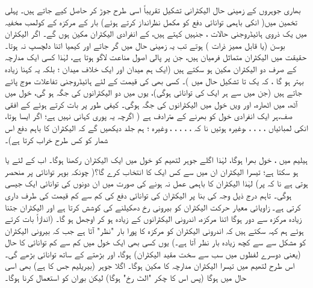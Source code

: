 بھاری جوہروں کے زمینی حال الیکٹرانی تشکیل تقریباً  اسی طرح جوڑ کر حاصل کیے جاتے ہیں۔ پہلی تخمین  میں( انکی باہمی توانائی دفع کو مکمل نظرانداز کرتے ہوئے)  بار  کے مرکزہ کے کولمب مخفیہ میں یک  ذروی ہائیڈروجنی حالات ،  جنہیں  کہتے ہیں، کے  انفرادی الیکٹران مکین ہوں گے۔ اگر الیکٹران بوسن (یا قابل  ممیز ذرات ) ہوتے تب یہ زمینی حال  میں  گر جاتے اور کیمیا اتنا دلچسپ نہ ہوتا۔ حقیقت میں الیکٹران متماثل فرمیان ہیں، جن پر پالی اصول مناعت لاگو ہوتا ہے،  لہٰذا کسی ایک مدارچہ کے  صرف دو الیکٹران مکین ہو   سکتے ہیں  (ایک ہم میدان اور ایک خلاف میدان ؛ بلکہ یہ کہنا زیادہ بہتر  ہو گا ، کہ   یک تا  تشکیل  حال میں  )۔ کسی بھی  کی قیمت کے لئے  ہائیڈروجنی تفاعلات موج پائے جاتے ہیں  (جن میں سے ہر ایک کی توانائی  ہوگی)، یوں    میں دو الیکٹرانوں کی جگہ ہو گی،   خول میں آٹھ،   میں اٹھارہ،  اور ویں خول میں  الیکٹرانوں کی جگہ ہوگی۔ کیفی طور پر بات کرتے ہوئے   کے افقی صف،ہر ایک انفرادی خول کو  بھرنے کے مترادف ہے ( اگرچہ یہ پوری کہانی نہیں ہے؛ اگر  ایسا ہوتا،  انکی لمبائیاں ،  ،  ،  ،  ،وغیرہ ہوتیں  نا کہ  ،  ،  ،  ،  ، وغیرہ ؛ ہم جلد دیکھیں گے کہ الیکٹران کا باہم   دفع اس شمار کو کس طرح خراب کرتا ہے)۔

ہیلیم میں ،  خول  بھرا ہوگا،  لہٰذا اگلے  جوہر لتھیم  کو  خول میں  ایک الیکٹران  رکھنا ہوگا۔ اب  کے لئے   یا  ہو سکتا ہے؛ تیسرا الیکٹران ان میں سے کس ایک کا انتخاب کرے گا؟( چونکہ بوہر توانائی  پر منحصر ہوتی ہے نا کہ  پر) لہٰذا الیکٹران کا باہمی عمل نہ ہونے کی صورت میں ان دونوں کی توانائی ایک  جیسی ہوگی۔ تاہم درج ذیل وجہ کی بنا پر الیکٹران کی توانائی دفع    کی کم سے کم قیمت کی طرف داری کرتی ہے۔  زاویائی معیار حرکت الیکٹران کو بیرونی رخ دھکیلنے کی کوشش کرتا ہے اور الیکٹران جتنا  زیادہ  مرکزہ سے دور ہوگا  اتنا مرکزہ،  اندرونی الیکٹرانوں  کے زیادہ  ہو  کر اوجھل ہو گا۔  (اندازاً بات کرتے ہوئے ہم کہہ سکتے ہیں کہ اندرونی الیکٹران کو مرکزہ کا پورا  بار   "نظر"  آتا ہے جب کہ بیرونی الیکٹران کو مشکل سے    سے کچھ زیادہ بار   نظر آتا ہے۔) یوں کسی بھی ایک خول میں کم سے کم توانائی کا حال (یعنی دوسرے لفظوں میں سب سے سخت مقید الیکٹران)      ہوگا،   اور بڑھتے      کے ساتھ توانائی بڑھے گی۔  اس طرح لتھیم میں تیسرا الیکٹران مدارچہ     کا مکین ہوگا۔ اگلا جوہر (بیریلیم جس کا      ہے)  بھی  اسی حال میں ہوگا (پس  اس کا چکر "الٹ  رخ" ہوگا) لیکن بوران      کو     استعمال کرنا ہوگا۔ 
 
